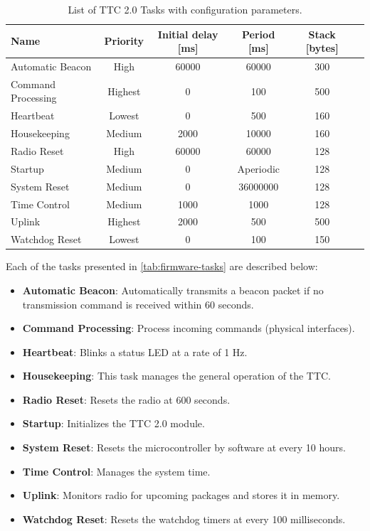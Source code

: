 \begin{table}[!h]
    \centering

    \begin{tabular}{lccccc}
        \toprule[1.5pt]
        \textbf{Name}          & \textbf{Priority} & \textbf{Initial delay [ms]} & \textbf{Period [ms]} & \textbf{Stack [bytes]} \\
        \midrule
        Automatic Beacon       & High    & 60000 & 60000     & 300 \\
        Command Processing     & Highest & 0     & 100       & 500 \\
        Heartbeat              & Lowest  & 0     & 500       & 160 \\
        Housekeeping           & Medium  & 2000  & 10000     & 160 \\
        Radio Reset            & High    & 60000 & 60000     & 128 \\
        Startup                & Medium  & 0     & Aperiodic & 128 \\
        System Reset           & Medium  & 0     & 36000000  & 128 \\
        Time Control           & Medium  & 1000  & 1000      & 128 \\
        Uplink                 & Highest & 2000  & 500       & 500 \\
        Watchdog Reset         & Lowest  & 0     & 100       & 150 \\
        \bottomrule[1.5pt]
    \end{tabular}
    \caption{List of TTC 2.0 Tasks with configuration parameters.}
    \label{tab:firmware-tasks}
\end{table}

Each of the tasks presented in \autoref{tab:firmware-tasks} are described below:

\begin{itemize}
    \item \textbf{Automatic Beacon}: Automatically transmits a beacon packet if no transmission command is received within 60 seconds.
    \item \textbf{Command Processing}: Process incoming commands (physical interfaces).
    \item \textbf{Heartbeat}: Blinks a status LED at a rate of 1 Hz.
    \item \textbf{Housekeeping}: This task manages the general operation of the TTC.
    \item \textbf{Radio Reset}: Resets the radio at 600 seconds.
    \item \textbf{Startup}: Initializes the TTC 2.0 module.
    \item \textbf{System Reset}: Resets the microcontroller by software at every 10 hours.
    \item \textbf{Time Control}: Manages the system time.
    \item \textbf{Uplink}: Monitors radio for upcoming packages and stores it in memory.
    \item \textbf{Watchdog Reset}: Resets the watchdog timers at every 100 milliseconds.
\end{itemize}

